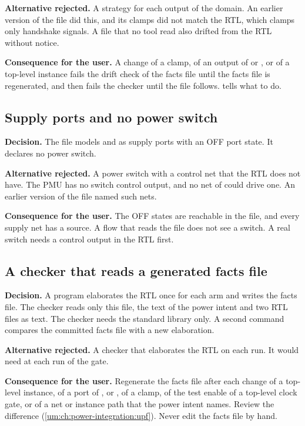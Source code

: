 \textbf{Alternative rejected.} A strategy for each output of the domain. An earlier version of the file did this, and its clamps did not match the RTL, which clamps only handshake signals. A file that no tool read also drifted from the RTL without notice.

\textbf{Consequence for the user.} A change of a clamp, of an output of  or , or of a top-level instance fails the drift check of the facts file until the facts file is regenerated, and then fails the checker until the file follows.  tells what to do.

\subsection{Supply ports and no power switch}\label{ds:ch:power-intent:dec-switch}
\textbf{Decision.} The file models  and  as supply ports with an OFF port state. It declares no power switch.

\textbf{Alternative rejected.} A power switch with a control net that the RTL does not have. The PMU has no switch control output, and no net of  could drive one. An earlier version of the file named such nets.

\textbf{Consequence for the user.} The OFF states are reachable in the file, and every supply net has a source. A flow that reads the file does not see a switch. A real switch needs a control output in the RTL first.

\subsection{A checker that reads a generated facts file}\label{ds:ch:power-intent:dec-facts}
\textbf{Decision.} A program elaborates the RTL once for each arm and writes the facts file. The checker reads only this file, the text of the power intent and two RTL files as text. The checker needs the standard library only. A second command compares the committed facts file with a new elaboration.

\textbf{Alternative rejected.} A checker that elaborates the RTL on each run. It would need  at each run of the gate.

\textbf{Consequence for the user.} Regenerate the facts file after each change of a top-level instance, of a port of ,  or , of a clamp, of the test enable of a top-level clock gate, or of a net or instance path that the power intent names. Review the difference (\cref{um:ch:power-integration:upf}). Never edit the facts file by hand.

